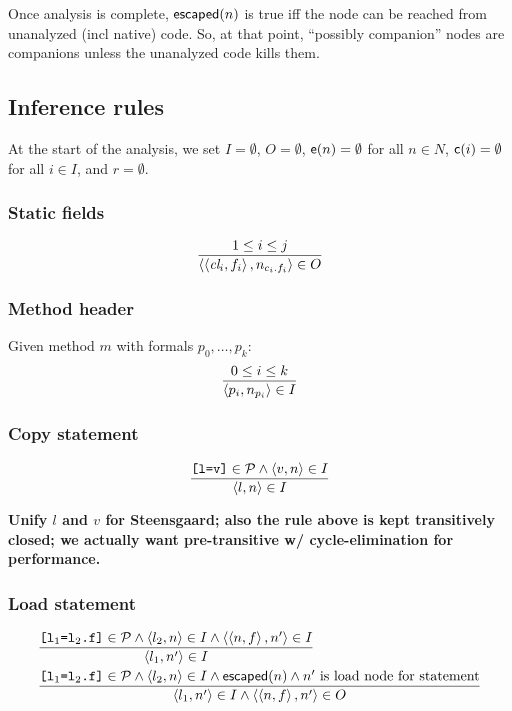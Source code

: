 \documentclass[11pt,notitlepage]{article}
\newcommand{\bigvar}[1]{\ensuremath{\text{\it #1}}}
\newcommand{\func}[1]{\ensuremath{\text{\sffamily #1}}}
\begin{document}
Once analysis is complete, $\func{escaped}(n)$ is true iff the node
can be reached from unanalyzed (incl native) code.  So, at that point,
``possibly companion'' nodes are companions unless the unanalyzed code
kills them.

\subsection{Inference rules}
At the start of the analysis, we set $I=\emptyset$, $O=\emptyset$,
$\func{e}(n)=\emptyset$ for all $n\in N$, $\func{c}(i)=\emptyset$ for all $i\in I$,
and $r=\emptyset$.

\subsubsection{Static fields}

\begin{displaymath}
\dfrac{1\leq i \leq j}{\tuple{\tuple{\bigvar{cl}_i,f_i},n_{c_i.f_i}}\in O}
\end{displaymath}

\subsubsection{Method header}
Given method $m$ with formals $p_0,\ldots,p_k$:
\begin{displaymath}
\dfrac{0\leq i \leq k}{\left\langle p_i, n_{p_i} \right\rangle\in I}
\end{displaymath}

\subsubsection{Copy statement}

\begin{displaymath}
\dfrac
{\text{\tt [l=v]}\in\mathcal{P} \wedge \left\langle v,n \right\rangle\in I}
{\left\langle l,n \right\rangle\in I}
\end{displaymath}

\textbf{Unify $l$ and $v$ for Steensgaard;  also the rule above is
  kept transitively closed; we actually want pre-transitive w/
  cycle-elimination for performance.}

\subsubsection{Load statement}

\begin{eqnarray*}
&
\dfrac
{\text{\tt [l$_1$=l$_2$.f]}\in\mathcal{P} \wedge
 \tuple{l_2,n}\in I \wedge
 \tuple{\tuple{n,f},n'}\in I}
{\tuple{l_1,n'}\in I}
\\&
\dfrac
{\text{\tt [l$_1$=l$_2$.f]}\in\mathcal{P} \wedge
 \tuple{l_2,n}\in I \wedge
 \func{escaped}(n) \wedge
 n' \text{ is load node for statement} }
{\tuple{l_1,n'}\in I \wedge \tuple{\tuple{n,f},n'}\in O}
\end{eqnarray*}
\end{document}
